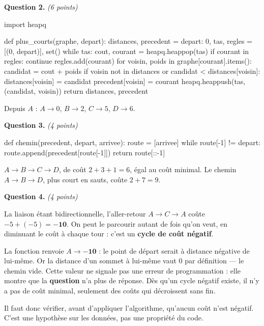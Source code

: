 \medskip
\textbf{Question 2.} \emph{(6 points)}

\begin{python}
import heapq

def plus_courts(graphe, depart):
    distances, precedent = {depart: 0}, {}
    tas, regles = [(0, depart)], set()
    while tas:
        cout, courant = heapq.heappop(tas)
        if courant in regles:
            continue
        regles.add(courant)
        for voisin, poids in graphe[courant].items():
            candidat = cout + poids
            if voisin not in distances or candidat < distances[voisin]:
                distances[voisin] = candidat
                precedent[voisin] = courant
                heapq.heappush(tas, (candidat, voisin))
    return distances, precedent
\end{python}

Depuis $A$ : $A \rightarrow 0$, $B \rightarrow 2$, $C \rightarrow 5$,
$D \rightarrow 6$.

\medskip
\textbf{Question 3.} \emph{(4 points)}

\begin{python}
def chemin(precedent, depart, arrivee):
    route = [arrivee]
    while route[-1] != depart:
        route.append(precedent[route[-1]])
    return route[::-1]
\end{python}

$A \rightarrow B \rightarrow C \rightarrow D$, de coût $2 + 3 + 1 = 6$, égal au
coût minimal. Le chemin $A \rightarrow B \rightarrow D$, plus court en sauts,
coûte $2 + 7 = 9$.

\medskip
\textbf{Question 4.} \emph{(4 points)}

La liaison étant bidirectionnelle, l'aller-retour $A \rightarrow C \rightarrow A$
coûte $-5 + (-5) = \mathbf{-10}$. On peut le parcourir autant de fois qu'on
veut, en diminuant le coût à chaque tour : c'est un \textbf{cycle de coût
négatif}.

La fonction renvoie $A \rightarrow \mathbf{-10}$ : le point de départ serait à
distance négative de lui-même. Or la distance d'un sommet à lui-même vaut $0$
par définition — le chemin vide. Cette valeur ne signale pas une erreur de
programmation : elle montre que la \textbf{question} n'a plus de réponse. Dès
qu'un cycle négatif existe, il n'y a pas de coût minimal, seulement des coûts
qui décroissent sans fin.

Il faut donc vérifier, avant d'appliquer l'algorithme, qu'aucun coût n'est
négatif. C'est une hypothèse sur les données, pas une propriété du code.

